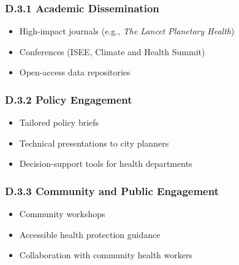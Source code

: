 \documentclass[12pt,a4paper,landscape]{article}
\begin{document}
\subsubsection*{D.3.1 Academic Dissemination}
\begin{itemize}[leftmargin=*]
    \item High-impact journals (e.g., \textit{The Lancet Planetary Health})
    \item Conferences (ISEE, Climate and Health Summit)
    \item Open-access data repositories
\end{itemize}

\subsubsection*{D.3.2 Policy Engagement}
\begin{itemize}[leftmargin=*]
    \item Tailored policy briefs
    \item Technical presentations to city planners
    \item Decision-support tools for health departments
\end{itemize}

\subsubsection*{D.3.3 Community and Public Engagement}
\begin{itemize}[leftmargin=*]
    \item Community workshops
    \item Accessible health protection guidance
    \item Collaboration with community health workers
\end{itemize}
\end{document}
